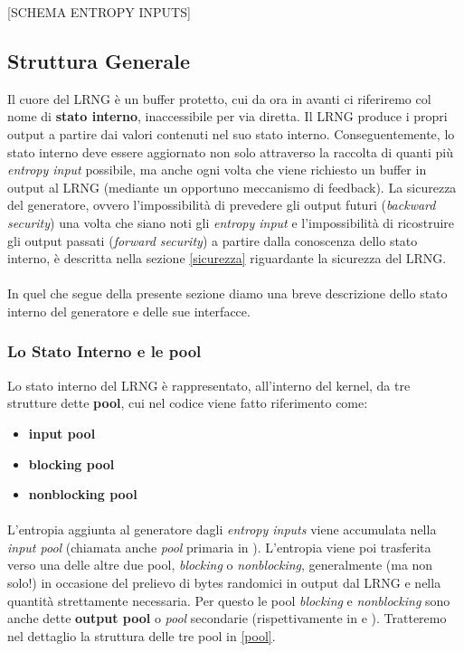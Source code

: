 \documentclass{article}
\begin{document}
 [SCHEMA ENTROPY INPUTS]
 \subsection{Struttura Generale}
 Il cuore del LRNG è un buffer protetto, cui da ora in avanti ci riferiremo col
 nome di \textbf{stato interno}, inaccessibile per via diretta. Il LRNG produce
 i propri output a partire dai valori contenuti nel suo stato interno.
 Conseguentemente, lo stato interno deve essere aggiornato non solo attraverso
 la raccolta di quanti più \emph{entropy input} possibile, ma anche ogni volta
 che viene richiesto un buffer in output al LRNG (mediante un
 opportuno meccanismo di feedback).
 La sicurezza del generatore, ovvero l'impossibilità di prevedere gli output
 futuri (\emph{backward security}) una volta che siano noti gli \emph{entropy
 input} e l'impossibilità di ricostruire gli output passati (\emph{forward
 security}) a partire dalla conoscenza dello stato interno, è descritta nella
 sezione \ref{sicurezza} riguardante la sicurezza del LRNG.
 \paragraph{}In quel che segue della presente sezione diamo una breve
 descrizione dello stato interno del generatore e delle sue interfacce.
 
 \subsubsection{Lo Stato Interno e le pool}
 Lo stato interno del LRNG è rappresentato, all'interno del kernel, da tre
 strutture dette \textbf{pool}, cui nel codice viene fatto riferimento come:
 \begin{itemize}
   \item \textbf{input pool} 
   \item \textbf{blocking pool}
   \item \textbf{nonblocking pool}
 \end{itemize}
 
 \paragraph{}L'entropia aggiunta al generatore dagli \emph{entropy inputs}
 viene accumulata nella \emph{input pool} (chiamata anche \emph{pool} primaria
 in \cite{gutt}). L'entropia viene poi trasferita verso una delle altre due
 pool, \emph{blocking} o \emph{nonblocking}, generalmente (ma non solo!) in
 occasione del prelievo di bytes randomici in output dal LRNG e nella quantità
 strettamente necessaria. Per questo le pool \emph{blocking} e
 \emph{nonblocking} sono anche dette \textbf{output pool} o \emph{pool}
 secondarie (rispettivamente in \cite{lach} e \cite{gutt}). Tratteremo nel
 dettaglio la struttura delle tre pool in \ref{pool}.
 
\end{document}
